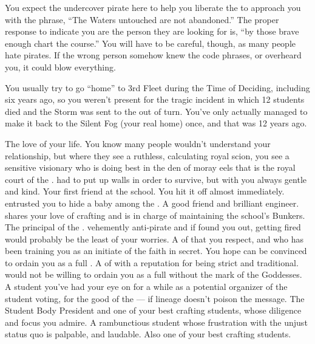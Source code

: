 \documentclass[char]{GL2020}
\begin{document}
\begin{itemz}[Notes]
    \item You expect the undercover pirate here to help you liberate the \iNet{} to approach you with the phrase, ``The Waters untouched are not abandoned.'' The proper response to indicate you are the person they are looking for is, ``by those brave enough chart the course.'' You will have to be careful, though, as many people hate pirates. If the wrong person somehow knew the code phrases, or overheard you, it could blow everything.
    \item You usually try to go ``home'' to 3rd Fleet during the Time of Deciding, including six years ago, so you weren't present for the tragic incident in which 12 students died and the Storm was sent to the \pShip{} out of turn. You've only actually managed to make it back to the Silent Fog (your real home) once, and that was 12 years ago.
\end{itemz}

\begin{contacts}
    \contact{\cPrince{}} The love of your life. You know many people wouldn't understand your relationship, but where they see a ruthless, calculating royal scion, you see a sensitive visionary who is doing \cPrince{\their} best in the den of moray eels that is the royal court of the \pFarm{}. \cPrince{\Theyhave} had to put up walls in order to survive, but with you \cPrince{\theyare} always gentle and kind.
    \contact{\cEthics{}} Your first friend at the school. You hit it off almost immediately. \cEthics{\They} entrusted you to hide a baby among the \pShippies{}.
    \contact{\cBunker{}} A good friend and brilliant engineer. \cBunker{} shares your love of crafting and is in charge of maintaining the school's Bunkers.
    \contact{\cPrincipal{}} The principal of the \pSchool{}. \cPrincipal{\Theyare} vehemently anti-pirate and if \cPrincipal{\they} found you out, getting fired would probably be the least of your worries.
    \contact{\cFlowPriest{}} A \cFlowPriest{\cleric} of \cFlow{} that you respect, and who has been training you as an initiate of the faith in secret. You hope \cFlowPriest{\they} can be convinced to ordain you as a full \cPirate{\cleric}.
    \contact{\cEbbPriest{}} A \cEbbPriest{\cleric} of \cEbb{} with a reputation for being strict and traditional. \cEbbPriest{\They} would not be willing to ordain you as a full \cPirate{\cleric} without the mark of the Goddesses.
    \contact{\cWarlordDaughter{}} A student you've had your eye on for a while as a potential organizer of the student voting, for the good of the \pShip{} — if \cWarlordDaughter{\their} lineage doesn't poison the message.
    \contact{\cPresident{}} The Student Body President and one of your best crafting students, whose diligence and focus you admire.
    \contact{\cPirateChild{}} A rambunctious student whose frustration with the unjust status quo is palpable, and laudable. Also one of your best crafting students.
\end{contacts}
\end{document}
